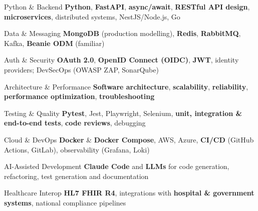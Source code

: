 
\begin{cvskills}

  \cvskill
  {Python \& Backend}
  {\textbf{Python}, \textbf{FastAPI}, \textbf{async/await}, \textbf{RESTful API design}, \textbf{microservices}, distributed systems, NestJS/Node.js, Go}

  \cvskill
  {Data \& Messaging}
  {\textbf{MongoDB} (production modelling), \textbf{Redis}, \textbf{RabbitMQ}, Kafka, \textbf{Beanie ODM} (familiar)}

  \cvskill
  {Auth \& Security}
  {\textbf{OAuth 2.0}, \textbf{OpenID Connect (OIDC)}, \textbf{JWT}, identity providers; DevSecOps (OWASP ZAP, SonarQube)}

  \cvskill
  {Architecture \& Performance}
  {\textbf{Software architecture}, \textbf{scalability}, \textbf{reliability}, \textbf{performance optimization}, \textbf{troubleshooting}}

  \cvskill
  {Testing \& Quality}
  {\textbf{Pytest}, Jest, Playwright, Selenium, \textbf{unit, integration \& end-to-end tests}, \textbf{code reviews}, debugging}

  \cvskill
  {Cloud \& DevOps}
  {\textbf{Docker} \& \textbf{Docker Compose}, AWS, Azure, \textbf{CI/CD} (GitHub Actions, GitLab), observability (Grafana, Loki)}

  \cvskill
  {AI-Assisted Development}
  {\textbf{Claude Code} and \textbf{LLMs} for code generation, refactoring, test generation and documentation}

  \cvskill
  {Healthcare Interop}
  {\textbf{HL7 FHIR R4}, integrations with \textbf{hospital \& government systems}, national compliance pipelines}

\end{cvskills}
